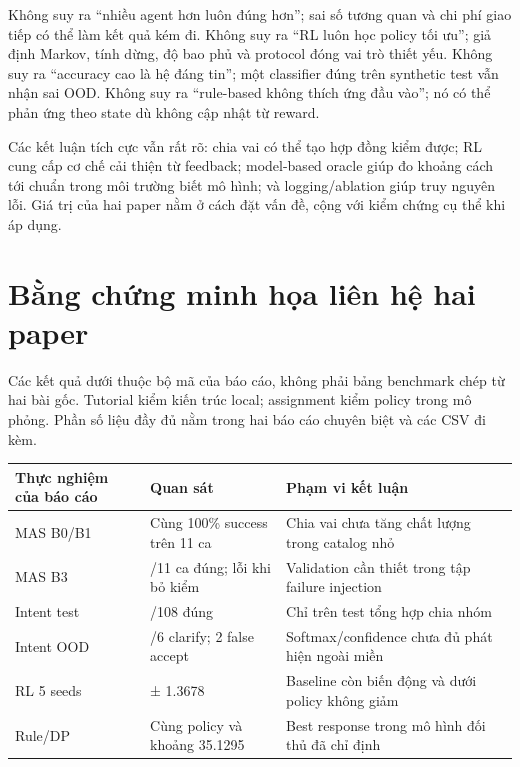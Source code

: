 Không suy ra ``nhiều agent hơn luôn đúng hơn''; sai số tương quan và chi
phí giao tiếp có thể làm kết quả kém đi. Không suy ra ``RL luôn học
policy tối ưu''; giả định Markov, tính dừng, độ bao phủ và protocol đóng
vai trò thiết yếu. Không suy ra ``accuracy cao là hệ đáng tin''; một
classifier đúng trên synthetic test vẫn nhận sai OOD. Không suy ra
``rule-based không thích ứng đầu vào''; nó có thể phản ứng theo state dù
không cập nhật từ reward.

Các kết luận tích cực vẫn rất rõ: chia vai có thể tạo hợp đồng kiểm
được; RL cung cấp cơ chế cải thiện từ feedback; model-based oracle giúp
đo khoảng cách tới chuẩn trong môi trường biết mô hình; và
logging/ablation giúp truy nguyên lỗi. Giá trị của hai paper nằm ở cách
đặt vấn đề, cộng với kiểm chứng cụ thể khi áp dụng.

\section{Bằng chứng minh họa liên hệ hai
paper}\label{bux1eb1ng-chux1ee9ng-minh-hux1ecda-liuxean-hux1ec7-hai-paper}

Các kết quả dưới thuộc bộ mã của báo cáo, không phải bảng benchmark chép
từ hai bài gốc. Tutorial kiểm kiến trúc local; assignment kiểm policy
trong mô phỏng. Phần số liệu đầy đủ nằm trong hai báo cáo chuyên biệt và
các CSV đi kèm.

{\def\LTcaptype{none} %
\begin{longtable}[]{@{}
  >{\raggedright\arraybackslash}p{}
  >{\raggedright\arraybackslash}p{}
  >{\raggedright\arraybackslash}p{}@{}}
\toprule\noalign{}
\begin{minipage}[b]{\linewidth}\raggedright
Thực nghiệm của báo cáo
\end{minipage} & \begin{minipage}[b]{\linewidth}\raggedright
Quan sát
\end{minipage} & \begin{minipage}[b]{\linewidth}\raggedright
Phạm vi kết luận
\end{minipage} \\
\midrule\noalign{}
\endhead
\bottomrule\noalign{}
\endlastfoot
MAS B0/B1 & Cùng 100\% success trên 11 ca & Chia vai chưa tăng chất
lượng trong catalog nhỏ \\
MAS B3 & 8/11 ca đúng; lỗi khi bỏ kiểm & Validation cần thiết trong tập
failure injection \\
Intent test & 108/108 đúng & Chỉ trên test tổng hợp chia nhóm \\
Intent OOD & 4/6 clarify; 2 false accept & Softmax/confidence chưa đủ
phát hiện ngoài miền \\
RL 5 seeds & 34.0997 ± 1.3678 & Baseline còn biến động và dưới policy
không giảm \\
Rule/DP & Cùng policy và khoảng 35.1295 & Best response trong mô hình
đối thủ đã chỉ định \\
\end{longtable}
}

